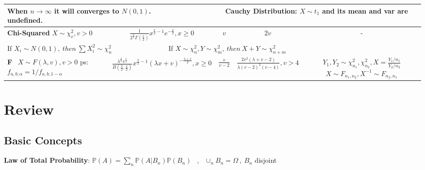 \documentclass[9pt]{article}
\begin{document}
\begin{longtable}{|l||c|c|c|c|}
    \multicolumn{5}{|l|}{When $n\to\infty$ it will converges to $N(0,1)$.\ \ \ \ \ \ \ \ \ \ \ \ \ \ \ \ \ \ \ \textbf{Cauchy Distribution}: $X\sim t_1$ and its mean and var are undefined.} \\
    \hline
    \makecell{\textbf{Chi-Squared} \\ $X\sim \chi^2_v,v>0$} & $\frac{1}{2^{\frac{v}{2}}\Gamma(\frac{v}{2})}x^{\frac{v}{2}-1}e^{-\frac{x}{2}},x\geq0$ & $v$ & $2v$ & - \\
    \hline
    \multicolumn{5}{|l|}{If $X_i\sim N(0,1), \ then \  \sum X_i^2\sim \chi_n^2$ \ \ \ \ \ \ \ \ \ \ \ \ \ \ \ \ If $X\sim \chi^2_n,Y\sim \chi^2_m, \ then \ X+Y\sim \chi^2_{n+m}$} \\
    \hline
    \makecell{\textbf{F} \ $X\sim F(\lambda,v),v>0$ \\ ps: $f_{a,b;\alpha}=1/f_{a,b;1-\alpha}$} & $\frac{\lambda^{\frac{\lambda}{2}}v^{\frac{v}{2}}}{B(\frac{\lambda}{2},\frac{v}{2})}x^{\frac{\lambda}{2}-1}(\lambda x+v)^{-\frac{\lambda+v}{2}},x\geq0$ & $\frac{v}{v-2}$ & {\footnotesize $\frac{2v^2(\lambda+v-2)}{\lambda(v-2)^2(v-4)},v>4$} & \makecell{$Y_1,Y_2\sim\chi^2_{n_1},\chi^2_{n_2},X=\frac{Y_1/n_1}{Y_2/n_2}$ \\ $X\sim F_{n_1,n_2},X^{-1}\sim F_{n_2,n_1}$} \\
    \hline
\end{longtable}


\section{Review}

\subsection{Basic Concepts}

\textbf{Law of Total Probability}: $\mathbb{P}(A)=\sum_{n}\mathbb{P}(A|B_n)\mathbb{P}(B_n)$ \ , \ $\cup_nB_n=\Omega \ , \ B_n$ disjoint
\end{document}

